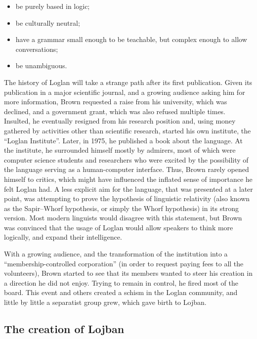 \begin{itemize}
    \setlength\itemsep{-0.5em}
    \item be purely based in logic;
    \item be culturally neutral;
    \item have a grammar small enough to be teachable, but complex enough to allow conversations;
    \item be unambiguous.
 \end{itemize}

The history of Loglan will take a strange path after its first publication. Given its publication in a major scientific journal, and a growing audience
asking him for more information, Brown requested a raise from his university, which was declined, and a government grant, which was also refused multiple times.
Insulted, he eventually resigned from his research position and, using money gathered by activities other than scientific research, started his own institute,
the ``Loglan Institute''. Later, in 1975, he published a book about the language. At the institute, he surrounded himself mostly by admirers, most of which were computer science
students and researchers who were excited by the possibility of the language serving as a human-computer interface. Thus, Brown rarely opened himself to critics,
which might have influenced the inflated sense of importance he felt Loglan had. A less explicit aim for the language, that was presented at a later point, was attempting
to prove the hypothesis of linguistic relativity (also known as the Sapir–Whorf hypothesis, or simply the Whorf hypothesis) in its strong version.
Most modern linguists would disagree with this statement, but Brown was convinced that the usage of Loglan would allow speakers to think more logically, and expand their
intelligence.\newline

With a growing audience, and the transformation of the institution into a ``membership-controlled corporation'' (in order to request paying fees to all the volunteers),
Brown started to see that its members wanted to steer his creation in a direction he did not enjoy. Trying to remain in control, he fired most of the board.
This event and others created a schism in the Loglan community, and little by little a separatist group grew, which gave birth to Lojban.

\subsection{The creation of Lojban}

